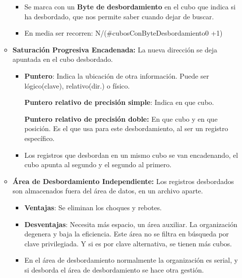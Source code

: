 \documentclass[12pt, twoside, openright]{report} %
\begin{document}
\begin{itemize}
\begin{itemize}
\begin{itemize}
        \item Se marca con un \textbf{Byte de desbordamiento} en el cubo que
          indica si ha desbordado, que nos permite saber cuando dejar de
          buscar.
          
        \item En media ser recorren: N/(\#cubosConByteDesbordamiento0 +1)
          
        \end{itemize}
      \item \textbf{Saturación Progresiva Encadenada:} La nueva dirección se
        deja apuntada en el cubo desbordado.
        

        \begin{itemize}
        \item \textbf{Puntero}: Indica la ubicación de otra información.
          Puede ser lógico(clave), relativo(dir.) o físico.
          

          
		  
            \textbf{Puntero relativo de precisión simple}: Indica en que
            cubo.
          
			
            \textbf{Puntero relativo de precisión doble:} En que cubo y
            en que posición. Es el que usa para este desbordamiento, al
            ser un registro específico.
           
			
        \item Los registros que desbordan en un mismo cubo se van
          encadenando, el cubo apunta al segundo y el segundo al
          primero.
          
        \end{itemize}
      \item \textbf{Área de Desbordamiento Independiente:} Los registros
        desbordados son almacenados fuera del área de datos, en un
        archivo aparte.
        

        \begin{itemize}
        \item \textbf{Ventajas}: Se eliminan los choques y rebotes.
          
        \item \textbf{Desventajas}: Necesita más espacio, un área auxiliar.
          La organización degenera y baja la eficiencia. Este área no se
          filtra en búsqueda por clave privilegiada. Y si es por clave
          alternativa, se tienen más cubos.
          
        \item En el área de desbordamiento normalmente la organización es
          serial, y si desborda el área de desbordamiento se hace otra
          gestión.
          

\end{itemize}
\end{itemize}
\end{itemize}
\end{document}
